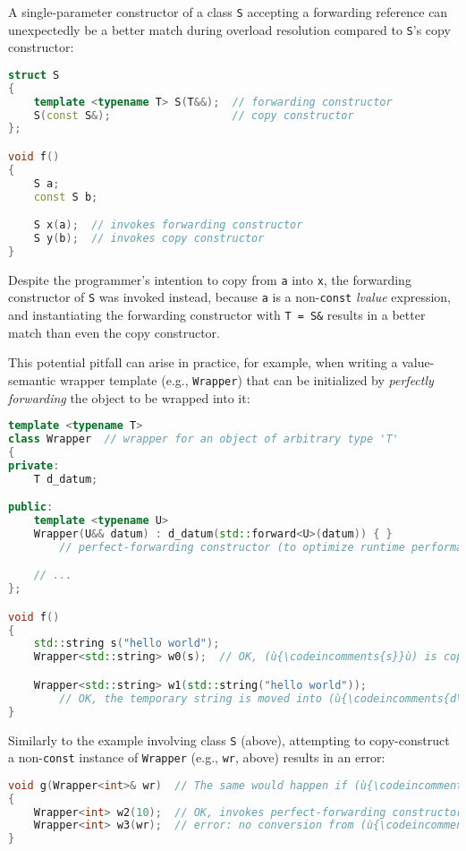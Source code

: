 A single-parameter constructor of a class \texttt{S} accepting a
forwarding reference can unexpectedly be a better match during overload
resolution compared to \texttt{S}'s copy constructor:

\begin{lstlisting}[language=C++]
struct S
{
    template <typename T> S(T&&);  // forwarding constructor
    S(const S&);                   // copy constructor
};

void f()
{
    S a;
    const S b;

    S x(a);  // invokes forwarding constructor
    S y(b);  // invokes copy constructor
}
\end{lstlisting}
    
\noindent Despite the programmer's intention to copy from \texttt{a} into
\texttt{x}, the forwarding constructor of \texttt{S} was invoked
instead, because \texttt{a} is a non-\texttt{const} \emph{lvalue}
expression, and instantiating the forwarding constructor with
\texttt{T}~\texttt{=}~\texttt{S\&} results in a better match than even
the copy constructor.

This potential pitfall can arise in practice, for example, when writing
a value-semantic wrapper template (e.g., \texttt{Wrapper}) that can be
initialized by \textit{perfectly forwarding} the object to be wrapped into it:

\begin{lstlisting}[language=C++]
template <typename T>
class Wrapper  // wrapper for an object of arbitrary type 'T'
{
private:
    T d_datum;

public:
    template <typename U>
    Wrapper(U&& datum) : d_datum(std::forward<U>(datum)) { }
        // perfect-forwarding constructor (to optimize runtime performance)

    // ...
};

void f()
{
    std::string s("hello world");
    Wrapper<std::string> w0(s);  // OK, (ù{\codeincomments{s}}ù) is copied into (ù{\codeincomments{d\_datum}}ù).

    Wrapper<std::string> w1(std::string("hello world"));
        // OK, the temporary string is moved into (ù{\codeincomments{d\_datum}}ù).
}
\end{lstlisting}
    
\noindent Similarly to the example involving class \texttt{S} (above), attempting
to copy-construct a non-\texttt{const} instance of \texttt{Wrapper}
(e.g., \texttt{wr}, above) results in an error:

\begin{lstlisting}[language=C++]
void g(Wrapper<int>& wr)  // The same would happen if (ù{\codeincomments{wr}}ù) were passed by value.
{
    Wrapper<int> w2(10);  // OK, invokes perfect-forwarding constructor
    Wrapper<int> w3(wr);  // error: no conversion from (ù{\codeincomments{Wrapper<int>}}ù) to (ù{\codeincomments{int}}ù)
}
\end{lstlisting}
    
